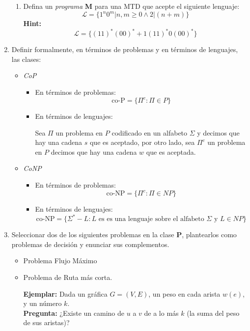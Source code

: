 \documentclass[11pt,letterpaper]{report}
\begin{document}
\begin{enumerate}
\begin{enumerate}
        \item Defina un \emph{programa} \textbf{M} para una MTD que acepte el siguiente lenguaje:
        \[
            \mathscr{L} = \{ 1^n0^m | n,m \geq 0 \land 2 | (n+m) \}
        \]
        \textbf{Hint:}
        \[
            \mathscr{L} = \{ (11)^*(00)^* + 1(11)^*0(00)^* \}    
        \]
    \end{enumerate}

\item Definir formalmente, en términos de problemas y en términos de lenguajes, las clases:
\begin{itemize}
    \item \textit{CoP}
    \begin{itemize}
        \item En términos de problemas:
        $$\text{co-P} = \{ \Pi^c : \Pi \in P \}$$

        \item En términos de lenguajes:
        
        Sea $\Pi$ un problema en $P$ codificado en un alfabeto $\Sigma$ y decimos que hay una cadena
        $s$ que es aceptado, por otro lado, sea $\Pi^c$ un problema en $P$ decimos que hay una
        cadena $w$ que es aceptada.
    \end{itemize}
    

    \item \textit{CoNP}
    \begin{itemize}
        \item En términos de problemas:
        $$\text{co-NP} = \{ \Pi^c : \Pi \in NP \}$$

        \item En términos de lenguajes:
        $$\text{co-NP} = \{ \Sigma^* - L : L \text{ es es una lenguaje sobre el alfabeto $\Sigma$ 
        y } L \in NP \}$$
    \end{itemize}
    
\end{itemize}


\item Seleccionar dos de los siguientes problemas en la clase \textbf{P}, plantearlos como problemas
de decisión y enunciar sus complementos.
\begin{itemize}
    \item Problema Flujo Máximo

    \item Problema de Ruta más corta.
    
    \textbf{Ejemplar:} Dada un gráfica $G=(V,E)$, un peso en cada arista $w(e)$, y un número $k$.\\
    \textbf{Pregunta:} ¿Existe un camino de $u$ a $v$ de a lo más $k$ (la suma del peso de sus aristas)?
    

\end{itemize}
\end{enumerate}
\end{document}
